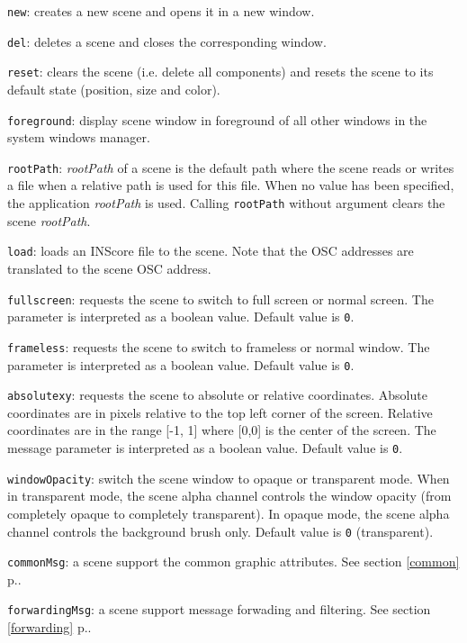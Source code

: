 \documentclass[a4paper,twoside]{report}
\newcommand{\fullref}[1]	{\ref{#1} p.\pageref{#1}}
\newcommand{\OSC}[1]		{\texttt{#1}}
\newcommand{\values}[1]		{\texttt{#1}}
\let\olditemize\itemize
\let\oldenditemize\enditemize
\renewenvironment{itemize} 	{\olditemize \setlength{\itemsep}{1mm}}{\oldenditemize}
\begin{document}
\begin{itemize}
\item \OSC{new}: creates a new scene and opens it in a new window.
\item \OSC{del}: deletes a scene and closes the corresponding window.
\item \OSC{reset}: clears the scene (i.e. delete all components) and resets the scene to its default state (position, size and color).
\item \OSC{foreground}: display scene window in foreground of all other windows in the system windows manager.
\item \OSC{rootPath}: \emph{rootPath} of a scene is the default path where the scene reads or writes a file when a relative path is used for this file. When no value has been specified, the application  \emph{rootPath} is used. Calling \OSC{rootPath} without argument clears the scene \emph{rootPath}.
\item \OSC{load}: loads an INScore file to the scene. Note that the OSC addresses are translated to the scene OSC address.
\item \OSC{fullscreen}: requests the scene to switch to full screen or normal screen.  The parameter is interpreted as a boolean value. Default value is \values{0}.
\item \OSC{frameless}: requests the scene to switch to frameless or normal window.  The parameter is interpreted as a boolean value. Default value is \values{0}.
\item \OSC{absolutexy}: requests the scene to absolute or relative coordinates. Absolute coordinates are in pixels relative to the top left corner of the screen. Relative coordinates are in the range [-1, 1] where [0,0] is the center of the screen. The message parameter is interpreted as a boolean value. Default value is \values{0}.
\item \OSC{windowOpacity}: switch the scene window to opaque or transparent mode. When in transparent mode, the scene alpha channel controls the window opacity (from completely opaque to completely transparent). In opaque mode, the scene alpha channel controls the background brush only. Default value is \values{0} (transparent).
\item \OSC{commonMsg}: a scene support the common graphic attributes. See section \fullref{common}.
\item \OSC{forwardingMsg}: a scene support message forwading and filtering. See section \fullref{forwarding}.
\end{itemize}
\end{document}
